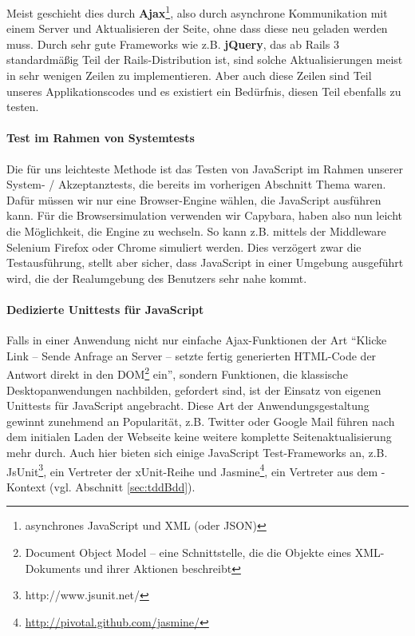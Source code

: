 Meist geschieht dies durch \textbf{Ajax}\footnote{asynchrones JavaScript und XML (oder JSON)}, also durch asynchrone Kommunikation mit einem Server und Aktualisieren der Seite, ohne dass diese neu geladen werden muss. Durch sehr gute Frameworks wie z.B. \textbf{jQuery}, das ab Rails 3 standardmäßig Teil der Rails-Distribution ist, sind solche Aktualisierungen meist in sehr wenigen Zeilen zu implementieren. Aber auch diese Zeilen sind Teil unseres Applikationscodes und es existiert ein Bedürfnis, diesen Teil ebenfalls zu testen.


\paragraph{Test im Rahmen von Systemtests} Die für uns leichteste Methode ist das Testen von JavaScript im Rahmen unserer System- / Akzeptanztests, die bereits im vorherigen Abschnitt Thema waren. Dafür müssen wir nur eine Browser-Engine wählen, die JavaScript ausführen kann. Für die Browsersimulation verwenden wir Capybara, haben also nun leicht die Möglichkeit, die Engine zu wechseln. So kann z.B. mittels der Middleware Selenium Firefox oder Chrome simuliert werden. Dies verzögert zwar die Testausführung, stellt aber sicher, dass JavaScript in einer Umgebung ausgeführt wird, die der Realumgebung des Benutzers sehr nahe kommt.
\paragraph{Dedizierte Unittests für JavaScript} Falls in einer Anwendung nicht nur einfache Ajax-Funktionen der Art "`Klicke Link -- Sende Anfrage an Server -- setzte fertig generierten HTML-Code der Antwort direkt in den DOM\footnote{Document Object Model -- eine Schnittstelle, die die Objekte eines XML-Dokuments und ihrer Aktionen beschreibt} ein"', sondern Funktionen, die klassische Desktopanwendungen nachbilden, gefordert sind, ist der Einsatz von eigenen Unittests für JavaScript angebracht.
Diese Art der Anwendungsgestaltung gewinnt zunehmend an Popularität, z.B. Twitter oder Google Mail führen nach dem initialen Laden der Webseite keine weitere komplette Seitenaktualisierung mehr durch.
Auch hier bieten sich einige JavaScript Test-Frameworks an, z.B. JsUnit\footnote{http://www.jsunit.net/}, ein Vertreter der xUnit-Reihe und Jasmine\footnote{\url{http://pivotal.github.com/jasmine/}}, ein Vertreter aus dem -Kontext (vgl. Abschnitt \ref{sec:tddBdd}).

